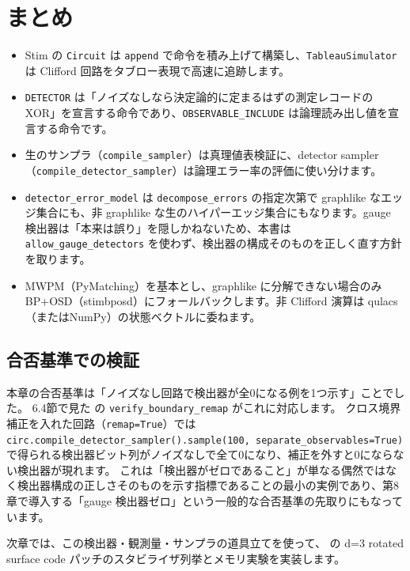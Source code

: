 \section{まとめ}\label{ch6:summary}

\begin{itemize}
  \item Stim の \texttt{Circuit} は \texttt{append} で命令を積み上げて構築し、\texttt{TableauSimulator} は Clifford 回路をタブロー表現で高速に追跡します。
  \item \texttt{DETECTOR} は「ノイズなしなら決定論的に定まるはずの測定レコードの XOR」を宣言する命令であり、\texttt{OBSERVABLE\_INCLUDE} は論理読み出し値を宣言する命令です。
  \item 生のサンプラ（\texttt{compile\_sampler}）は真理値表検証に、detector sampler（\texttt{compile\_detector\_sampler}）は論理エラー率の評価に使い分けます。
  \item \texttt{detector\_error\_model} は \texttt{decompose\_errors} の指定次第で graphlike なエッジ集合にも、非 graphlike な生のハイパーエッジ集合にもなります。gauge 検出器は「本来は誤り」を隠しかねないため、本書は \texttt{allow\_gauge\_detectors} を使わず、検出器の構成そのものを正しく直す方針を取ります。
  \item MWPM（PyMatching）を基本とし、graphlike に分解できない場合のみ BP+OSD（stimbposd）にフォールバックします。非 Clifford 演算は qulacs（またはNumPy）の状態ベクトルに委ねます。
\end{itemize}

\subsection*{合否基準での検証}

本章の合否基準は「ノイズなし回路で検出器が全0になる例を1つ示す」ことでした。
6.4節で見た  の \texttt{verify\_boundary\_remap} がこれに対応します。
クロス境界補正を入れた回路（\texttt{remap=True}）では \texttt{circ.compile\_detector\_sampler().sample(100, separate\_observables=True)} で得られる検出器ビット列がノイズなしで全て0になり、補正を外すと0にならない検出器が現れます。
これは「検出器がゼロであること」が単なる偶然ではなく検出器構成の正しさそのものを示す指標であることの最小の実例であり、第8章で導入する「gauge 検出器ゼロ」という一般的な合否基準の先取りにもなっています。

次章では、この検出器・観測量・サンプラの道具立てを使って、 の d=3 rotated surface code パッチのスタビライザ列挙とメモリ実験を実装します。

